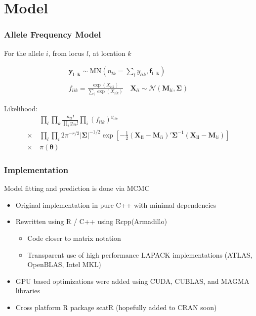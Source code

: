 \documentclass[slidestop,mathserif]{beamer}
\begin{document}
\section{Model}

\begin{frame}
\frametitle{Allele Frequency Model}

For the allele $i$, from locus $l$, at location $k$

\begin{align*}
\bm{y_{l \cdot k}} \sim \text{MN}\left(n_{lk}=\textstyle\sum_i y_{lik}, \bm{f_{l \cdot k}}\right) \\
\\
f_{lik} = \frac{\exp(X_{lik})}{\sum_i \exp(X_{lik})} \quad
\bm{X}_{li} \sim \mathcal{N}( \bm{M}_{li}, \bm{\Sigma_{}})
\end{align*}

\pause

Likelihood:
\begin{align*}
       &~\prod_l \prod_k \frac{n_{lk}!}{\prod_i y_{lik}!} \textstyle\prod_i (f_{lik})^{y_{lik}} \\
\times &~\prod_l \prod_i 2\pi^{-r/2} |\bm\Sigma|^{-1/2} \exp\left[ -\frac{1}{2}(\bm{X_{li}} - \bm{M}_{li})'\bm\Sigma^{-1} (\bm{X_{li}} - \bm{M}_{li}) \right]\\
\times &~\pi(\bm\theta)
\end{align*}

\end{frame}


\begin{frame}
\frametitle{Implementation}

Model fitting and prediction is done via MCMC
\begin{itemize} \addtolength{\itemsep}{3mm}
\item Original implementation in pure C++ with minimal dependencies
\item Rewritten using R / C++ using Rcpp(Armadillo) 
\begin{itemize}
\item Code closer to matrix notation
\item Transparent use of high performance LAPACK implementations (ATLAS, OpenBLAS, Intel MKL)
\end{itemize}
\item GPU based optimizations were added using CUDA, CUBLAS, and MAGMA libraries
\item Cross platform R package scatR (hopefully added to CRAN soon)
\end{itemize}

\end{frame}
\end{document}
